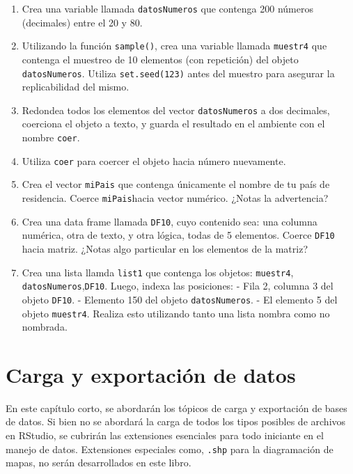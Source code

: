 \documentclass[
]{article}
\providecommand{\tightlist}{%
  \setlength{\itemsep}{0pt}\setlength{\parskip}{0pt}}
\theoremstyle{definition}
\theoremstyle{definition}
\theoremstyle{definition}
\theoremstyle{definition}
\theoremstyle{remark}
\begin{document}
\begin{enumerate}
\def\labelenumi{\arabic{enumi}.}
\tightlist
\item
  Crea una variable llamada \texttt{datosNumeros} que contenga 200 números (decimales) entre el 20 y 80.
\item
  Utilizando la función \texttt{sample()}, crea una variable llamada \texttt{muestr4} que contenga el muestreo de 10 elementos (con repetición) del objeto \texttt{datosNumeros}. Utiliza \texttt{set.seed(123)}
  antes del muestro para asegurar la replicabilidad del mismo.
\item
  Redondea todos los elementos del vector \texttt{datosNumeros} a dos decimales, coerciona el objeto a texto, y guarda el resultado en el ambiente con el nombre \texttt{coer}.
\item
  Utiliza \texttt{coer} para coercer el objeto hacia número nuevamente.
\item
  Crea el vector \texttt{miPais} que contenga únicamente el nombre de tu país de residencia. Coerce \texttt{miPais}hacia vector numérico. ¿Notas la advertencia?
\item
  Crea una data frame llamada \texttt{DF10}, cuyo contenido sea: una columna numérica, otra de texto, y otra lógica, todas de 5 elementos. Coerce \texttt{DF10} hacia matriz. ¿Notas algo particular en los elementos de la matriz?
\item
  Crea una lista llamda \texttt{list1} que contenga los objetos: \texttt{muestr4}, \texttt{datosNumeros},\texttt{DF10}. Luego, indexa las posiciones:
  - Fila 2, columna 3 del objeto \texttt{DF10}.
  - Elemento 150 del objeto \texttt{datosNumeros}.
  - El elemento 5 del objeto \texttt{muestr4}.
  Realiza esto utilizando tanto una lista nombra como no nombrada.
\end{enumerate}

\hypertarget{carga-y-exportaciuxf3n-de-datos}{%
\section{\texorpdfstring{\textbf{Carga y exportación de datos}}{Carga y exportación de datos}}\label{carga-y-exportaciuxf3n-de-datos}}

En este capítulo corto, se abordarán los tópicos de carga y exportación de bases de datos. Si bien no se abordará la carga de todos los tipos posibles de archivos en RStudio, se cubrirán las extensiones esenciales para todo iniciante en el manejo de datos. Extensiones especiales como, \texttt{.shp} para la diagramación de mapas, no serán desarrollados en este libro.
\end{document}
